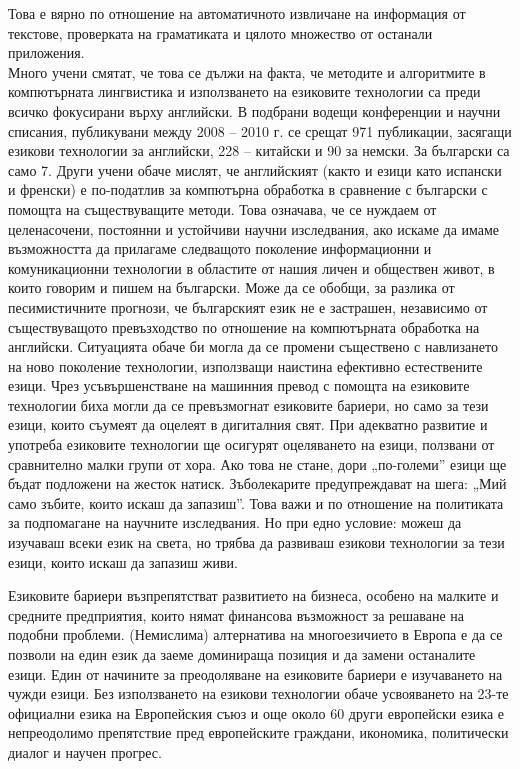 \begin{multicols}{2}
Това е вярно по отношение на автоматичното извличане на  информация от текстове, проверката на граматиката и цялото множество от останали приложения. \\
Много учени смятат, че това се дължи на факта, че методите и алгоритмите в компютърната лингвистика и използването на езиковите технологии са преди всичко фокусирани върху английски. В подбрани водещи конференции и научни списания, публикувани между 2008 – 2010 г. се срещат 971 публикации, засягащи  езикови технологии за английски, 228 – китайски и  90 за немски. За български са само 7. Други учени обаче мислят, че английският (както и езици като испански и френски) е по-податлив за компютърна обработка в сравнение с български с помощта на съществуващите методи.
Това означава, че се нуждаем от целенасочени, постоянни и устойчиви научни изследвания, ако искаме да имаме възможността да прилагаме следващото поколение информационни и комуникационни технологии в областите от нашия личен и обществен живот, в които говорим и пишем на български. 
Може да се обобщи, за разлика от песимистичните прогнози, че българският език не е застрашен, независимо от съществуващото превъзходство по отношение на компютърната обработка на английски. Ситуацията обаче би могла да се промени съществено с навлизането на ново поколение технологии, използващи наистина ефективно естествените езици. Чрез усъвършенстване на машинния превод с помощта на езиковите технологии биха могли да се превъзмогнат езиковите бариери, но само за тези езици, които съумеят да оцелеят в дигиталния свят. При адекватно развитие и употреба езиковите технологии ще осигурят оцеляването на езици, ползвани от сравнително малки групи от хора. Ако това не стане, дори „по-големи” езици ще бъдат подложени на жесток натиск. 
Зъболекарите предупреждават на шега: „Мий само зъбите, които искаш да запазиш”. Това важи и по отношение на политиката за подпомагане на научните изследвания. Но при едно условие: можеш да изучаваш всеки език на света, но трябва да развиваш езикови технологии за тези езици, които искаш да запазиш живи.


  Езиковите бариери възпрепятстват развитието на бизнеса, особено на малките и средните предприятия, които нямат финансова възможност за решаване на подобни проблеми. (Немислима) алтернатива на многоезичието в Европа е да се позволи на един език да заеме доминираща позиция и да замени останалите езици. Един от начините за преодоляване на езиковите бариери е изучаването на чужди езици. Без използването на езикови технологии обаче усвояването на 23-те официални езика на Европейския съюз и още около 60 други европейски езика е непреодолимо препятствие пред европейските граждани, икономика, политически диалог и научен прогрес.


\end{multicols}
